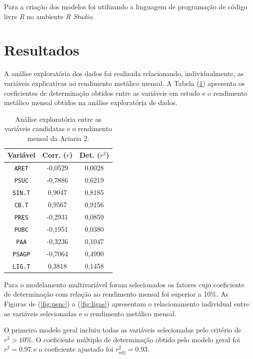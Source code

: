 \begin{multicols}{2}
	Para a criação dos modelos foi utilizando a linguagem de programação de código livre \emph{R}\cite{rcore} no ambiente \emph{R Studio}.
\section{Resultados}
	A análise exploratória dos dados foi realizada relacionando, individualmente, as variáveis explicativas ao rendimento metálico mensal.	A Tabela (\ref{tab:corr}) apresenta os coeficientes de determinação obtidos entre as variáveis em estudo e o rendimento metálico mensal obtidos na análise exploratória de dados.	
	\begin{table}[H]
		\begin{center}
		\begin{small}
		\caption{Análise exploratória entre as variáveis candidatas e o rendimento mensal da Aciaria 2.}
		\label{tab:corr}
			\begin{tabular}{ccc}
				\hline
				Variável & Corr. ($r$) & Det. ($r^2$) \\
				\hline \hline
				\texttt{ARET} 	& -0,0529 	&  0,0028	\\
				\texttt{PSUC}	& -0,7886	&  0,6219	\\
				\texttt{SIN.T}  &  0,9047	&  0,8185	\\
				\texttt{CB.T}	&  0,9567	&  0,9156	\\
				\texttt{PRES}	& -0,2931	&  0,0859	\\
				\texttt{PUBC}	& -0,1951	&  0,0380	\\
				\texttt{PAA}	& -0,3236	&  0,1047	\\
				\texttt{PSAGP}	& -0,7064	&  0,4990	\\
				\texttt{LIG.T}	&  0,3818	&  0,1458	\\
				\hline
			\end{tabular}
			\end{small}
			\end{center}
	\end{table}	
	Para o modelamento multivariável foram selecionados os fatores cujo coeficiente de determinação com relação ao rendimento mensal foi superior a 10\%. As Figuras de (\ref{fig:psuc}) a (\ref{fig:ligas}) apresentam o relacionamento individual entre as variáveis selecionadas e o rendimento metálico mensal. 	
	
	O primeiro modelo geral incluiu todas as variáveis selecionadas pelo critério de $r^2 > 10\%$. O coeficiente múltiplo de determinação obtido pelo modelo geral foi $r^2 = 0.97$ e o coeficiente ajustado foi $r^2_{adj}=0.93$. 
	

\end{multicols}
